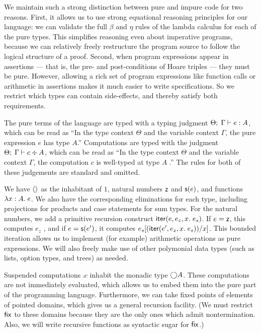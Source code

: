 \documentclass[preprint,natbib]{sigplanconf}
\begin{document}
We maintain such a strong distinction between pure and impure code for
two reasons. First, it allows us to use strong equational
reasoning principles for our language: we can validate the full
$\beta$ and $\eta$ rules of the lambda calculus for each of the pure
types. This simplifies reasoning even about imperative programs,
because we can relatively freely restructure the program source to
follow the logical structure of a proof. Second, when program
expressions appear in assertions --- that is, the pre- and
post-conditions of Hoare triples --- they must be pure. However,
allowing a rich set of program expressions like function calls or
arithmetic in assertions makes it much easier to write
specifications. So we restrict which types can contain side-effects,
and thereby satisfy both requirements.

The pure terms of the language are typed with a typing judgment
${\Theta};\;{\Gamma} \vdash {e} : {A}$, which can be read as ``In the type context
$\Theta$ and the variable context $\Gamma$, the pure expression $e$
has type $A$.'' Computations are typed with the judgment
${\Theta};\;{\Gamma} \vdash {c} \div {A}$, which can be read as ``In the type context
$\Theta$ and the variable context $\Gamma$, the computation $c$ is
well-typed at type $A$ .'' The rules for both of these judgements are
standard and omitted.

We have $\left<\right>$ as the inhabitant of $1$, natural numbers $\mbox{\textsf{{z}}}$ and
$\mbox{\textsf{{s}}}(e)$, and functions $\lambda x:A.\;e$. We also have the corresponding
eliminations for each type, including projections for products and
case statements for sum types. For the natural numbers, we add a
primitive recursion construct $\mbox{\textsf{{iter}}}(e, {e_z}, {x}.\; {e_s})$. If $e = \mbox{\textsf{{z}}}$,
this computes $e_z$ , and if $e = \mbox{\textsf{{s}}}(e')$, it computes
$e_s[(\mbox{\textsf{{iter}}}(e', {e_z}, {x}.\; {e_s}))/x]$. This bounded iteration allows us
to implement (for example) arithmetic operations as pure expressions.
We will also freely make use of other polymonial data types (such as
lists, option types, and trees) as needed. 

Suspended computations $\comp{c}$ inhabit the monadic type
$\bigcirc{A}$.  These computations are not immediately evaluated, which
allows us to embed them into the pure part of the programming
language. Furthermore, we can take fixed points of elements of pointed
domains, which gives us a general recursion facility. (We must
restrict $\mbox{\textsf{{fix}}}$ to these domains because they are the only ones
which admit nontermination. Also, we will write recursive functions as
syntactic sugar for $\mbox{\textsf{{fix}}}$.)  
\end{document}
